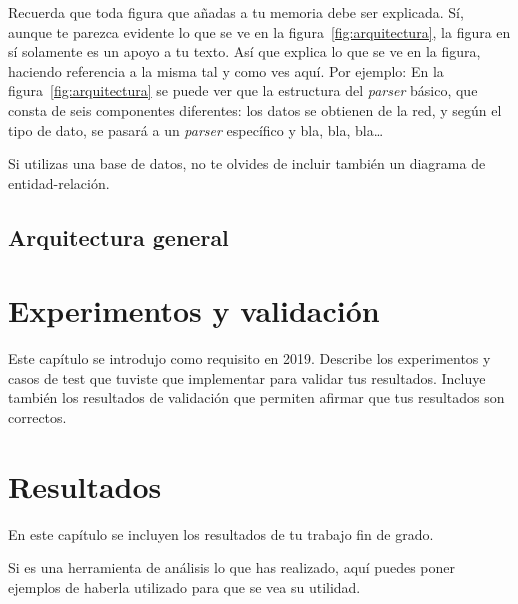 \documentclass[a4paper, 12pt]{book}
\begin{document}
 
Recuerda que toda figura que añadas a tu memoria debe ser explicada.
Sí, aunque te parezca evidente lo que se ve en la figura~\ref{fig:arquitectura}, la figura en sí solamente es un apoyo a tu texto.
Así que explica lo que se ve en la figura, haciendo referencia a la misma tal y como ves aquí.
Por ejemplo: En la figura~\ref{fig:arquitectura} se puede ver que la estructura del \emph{parser} básico, que consta de seis componentes diferentes: los datos se obtienen de la red, y según el tipo de dato, se pasará a un \emph{parser} específico y bla, bla, bla\ldots

Si utilizas una base de datos, no te olvides de incluir también un diagrama de entidad-relación.

\section{Arquitectura general} 
\label{sec:arquitectura}


\cleardoublepage
\chapter{Experimentos y validación}
\label{chap:experimentos}

Este capítulo se introdujo como requisito en 2019. 
Describe los experimentos y casos de test que tuviste que implementar para validar tus resultados. 
Incluye también los resultados de validación que permiten afirmar que tus resultados son correctos. 



\cleardoublepage
\chapter{Resultados}
\label{chap:resultados}

En este capítulo se incluyen los resultados de tu trabajo fin de grado.

Si es una herramienta de análisis lo que has realizado, aquí puedes poner ejemplos de haberla utilizado para que se vea su utilidad.
\end{document}
